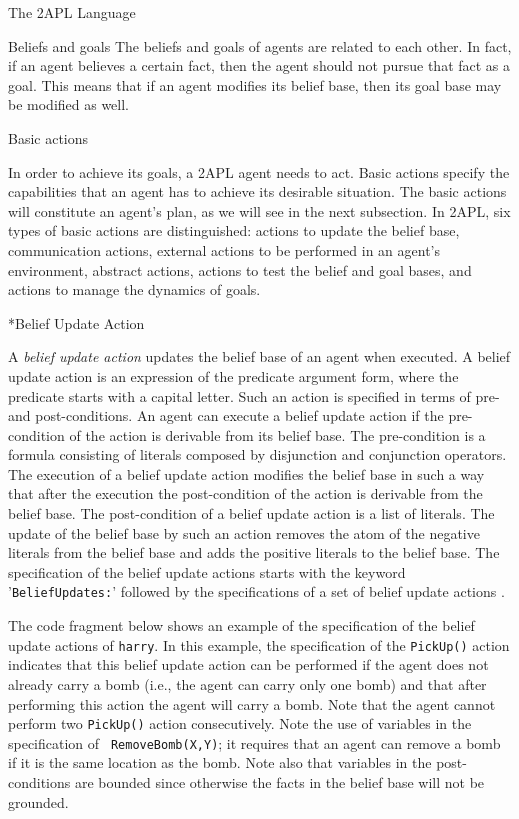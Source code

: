 \begin{chapter}{The 2APL Language}
\begin{section}{Beliefs and goals}
The beliefs and goals of agents are related to each other. In fact,
if an agent believes a certain fact, then the agent should not
pursue that fact as a goal. This means that if an agent modifies its
belief base, then its goal base may be modified as well.
\end{section}


\begin{section}{Basic actions}

In order to achieve its goals, a 2APL agent needs to act. Basic
actions specify the capabilities that an agent has to achieve its
desirable situation. The basic actions will constitute an agent's
plan, as we will see in the next subsection. In 2APL, six types of
basic actions are distinguished: actions to update the belief base,
communication actions, external actions to be performed in an
agent's environment, abstract actions, actions to test the belief
and goal bases, and actions to manage the dynamics of goals.

\begin{subsection}*{Belief Update Action}

A {\em belief update action} updates the belief base of an agent
when executed. A belief update action  is an
expression of the predicate argument form, where the predicate
starts with a capital letter. Such an action is specified in terms
of pre- and post-conditions. An agent can execute a belief update
action if the pre-condition of the action is derivable from its
belief base. The pre-condition is a formula consisting of literals
composed by disjunction and conjunction operators. The execution of
a belief update action modifies the belief base in such a way that
after the execution the post-condition of the action is derivable
from the belief base. The post-condition of a belief update action
is a list of literals. The update of the belief base by such an
action removes the atom of the negative literals from the belief
base and adds the positive literals to the belief base. The
specification of the belief update actions starts with the keyword
'{\tt BeliefUpdates:}' followed by the specifications of a set of
belief update actions .

The code fragment below shows an example of the specification of the
belief update actions of {\tt harry}. In this example, the
specification of the {\tt PickUp()} action indicates that this
belief update action can be performed if the agent does not already
carry a bomb (i.e., the agent can carry only one bomb) and that
after performing this action the agent will carry a bomb.  Note that
the agent cannot perform two {\tt PickUp()} action consecutively.
Note the use of variables in the specification of {\tt
RemoveBomb(X,Y)}; it requires that an agent can remove a bomb if it
is the same location as the bomb. Note also that variables in the
post-conditions are bounded since otherwise the facts in the belief
base will not be grounded.


\end{subsection}
\end{section}
\end{chapter}
